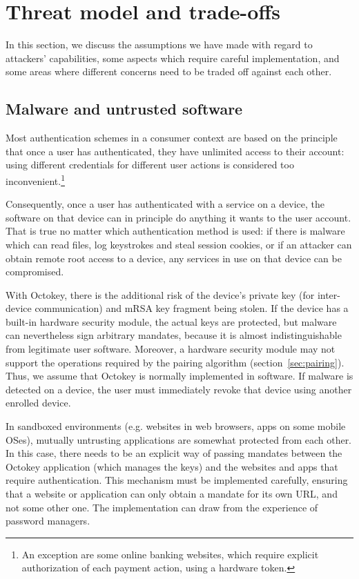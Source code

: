 \section{Threat model and trade-offs}\label{sec:threat}

In this section, we discuss the assumptions we have made with regard to attackers' capabilities,
some aspects which require careful implementation, and some areas where different concerns need to
be traded off against each other.

\subsection{Malware and untrusted software}\label{sec:malware}

Most authentication schemes in a consumer context are based on the principle that once a user has
authenticated, they have unlimited access to their account: using different credentials for
different user actions is considered too inconvenient.\footnote{An exception are some online banking
websites, which require explicit authorization of each payment action, using a hardware token.}

Consequently, once a user has authenticated with a service on a device, the software on that device
can in principle do anything it wants to the user account. That is true no matter which
authentication method is used: if there is malware which can read files, log keystrokes and steal
session cookies, or if an attacker can obtain remote root access to a device, any services in use on
that device can be compromised.

With Octokey, there is the additional risk of the device's private key (for inter-device
communication) and mRSA key fragment being stolen. If the device has a built-in hardware security
module, the actual keys are protected, but malware can nevertheless sign arbitrary mandates, because
it is almost indistinguishable from legitimate user software. Moreover, a hardware security module
may not support the operations required by the pairing algorithm (section~\ref{sec:pairing}). Thus,
we assume that Octokey is normally implemented in software. If malware is detected on a device, the
user must immediately revoke that device using another enrolled device.

In sandboxed environments (e.g. websites in web browsers, apps on some mobile OSes), mutually
untrusting applications are somewhat protected from each other. In this case, there needs to be an
explicit way of passing mandates between the Octokey application (which manages the keys) and the
websites and apps that require authentication. This mechanism must be implemented carefully,
ensuring that a website or application can only obtain a mandate for its own URL, and not some other
one. The implementation can draw from the experience of password managers.~\cite{Li14, Silver14}

